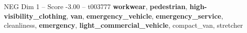 \begin{textsample}{NEG Dim 1 – Score -3.00 – t003777}  \label{ex:f1_neg_030}
\textbf{workwear}, \textbf{pedestrian}, \textbf{high-visibility\_clothing}, \textbf{van}, \textbf{emergency\_vehicle}, \textbf{emergency\_service}, cleanliness, \textbf{emergency}, \textbf{light\_commercial\_vehicle}, compact\_van, stretcher

\end{textsample}
